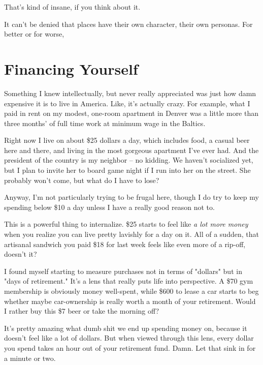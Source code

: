 \documentclass[]{book}
\begin{document}
That's kind of insane, if you think about it.

It can't be denied that places have their own character, their own personas. For
better or for worse,



\chapter{Financing Yourself}


Something I knew intellectually, but never really appreciated was just how damn
expensive it is to live in America. Like, it's actually crazy. For example, what
I paid in rent on my modest, one-room apartment in Denver was a little more than
three months' of full time work at minimum wage in the Baltics.

Right now I live on about \$25 dollars a day, which includes food, a casual beer
here and there, and living in the most gorgeous apartment I've ever had. And the
president of the country is my neighbor -- no kidding. We haven't socialized
yet, but I plan to invite her to board game night if I run into her on the
street. She probably won't come, but what do I have to lose?

Anyway,  I'm not particularly trying to be frugal
here, though I do try to keep my spending below \$10 a day unless I have a
really good reason not to.

This is a powerful thing to internalize. \$25 starts to feel like \emph{a lot
more money} when you realize you can live pretty lavishly for a day on it. All
of a sudden, that artisanal sandwich you paid \$18 for last week feels like even
more of a rip-off, doesn't it?

I found myself starting to measure purchases not in terms of "dollars" but in
"days of retirement." It's a lens that really puts life into perspective. A \$70
gym membership is obviously money well-spent, while \$600 to lease a car starts
to beg whether maybe car-ownership is really worth a month of your retirement.
Would I rather buy this \$7 beer or take the morning off?

 It's pretty amazing what dumb shit we end up spending
money on, because it doesn't feel like a lot of dollars. But when viewed through
this lens, every dollar you spend takes an hour out of your retirement fund.
Damn. Let that sink in for a minute or two.
\end{document}
